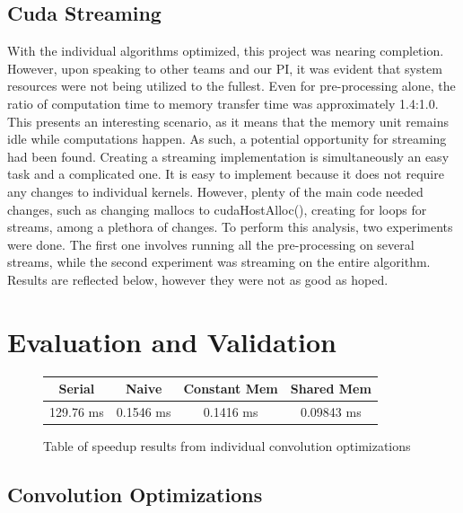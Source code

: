 \documentclass[conference]{IEEEtran}
\begin{document}
\subsection{Cuda Streaming}
With the individual algorithms optimized, this project was nearing completion. However, upon speaking to other teams and our PI, it was evident that system resources were not being utilized to the fullest. Even for pre-processing alone, the ratio of computation time to memory transfer time was approximately 1.4:1.0. This presents an interesting scenario, as it means that the memory unit remains idle while computations happen. As such, a potential opportunity for streaming had been found.
Creating a streaming implementation is simultaneously an easy task and a complicated one. It is easy to implement because it does not require any changes to individual kernels. However, plenty of the main code needed changes, such as changing mallocs to cudaHostAlloc(), creating for loops for streams, among a plethora of changes.
To perform this analysis, two experiments were done. The first one involves running all the pre-processing on several streams, while the second experiment was streaming on the entire algorithm. Results are reflected below, however they were not as good as hoped.





\section{Evaluation and Validation}

\begin{figure}[h]
\begin{center}
\begin{tabular}{ |c|c|c|c|} 
 \hline
 Serial & Naive & Constant Mem & Shared Mem \\ 
 \hline
 129.76 ms & 0.1546 ms & 0.1416 ms & 0.09843 ms\\
 \hline
\end{tabular}\caption{Table of speedup results from individual convolution optimizations}\label{table:convolutionTimes}
\end{center}
\end{figure}
\subsection{Convolution Optimizations}
\end{document}
